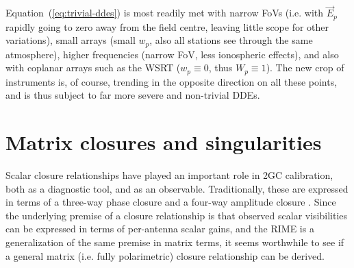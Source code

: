 \documentclass[referee]{aa}
\newcommand{\jones}[2]{\vec {#1}_{#2}}
\newcommand{\coh}[2]{\mathsf{{#1}}_{{#2}}}
\begin{document}
Equation~(\ref{eq:trivial-ddes}) is most readily met with narrow FoVs (i.e. with $\jones{E}{p}$ rapidly going to zero away from the field centre, leaving little scope for other variations), small arrays (small $w_p$, also all stations see through the same atmosphere), higher frequencies (narrow FoV, less ionospheric effects), and also with coplanar arrays such as the WSRT ($w_p\equiv0$, thus $W_p\equiv1$). The new crop of instruments is, of course, trending in the opposite direction on all these points, and is thus subject to far more severe and non-trivial DDEs.


% 
% 
% 
% 
% 

\section{Matrix closures and singularities\label{sec:closures}}

Scalar closure relationships have played an important role in 2GC calibration, both as a diagnostic tool, and as an observable. Traditionally, these are expressed in terms of a three-way phase closure and a four-way amplitude closure \citep[see e.g.][Sect.~10.3]{tms}. Since the underlying premise of a closure relationship is that observed scalar visibilities can be expressed in terms of per-antenna scalar gains, and the RIME is a generalization of the same premise in matrix terms, it seems worthwhile to see if a general matrix (i.e. fully polarimetric) closure relationship can be derived.
\end{document}
